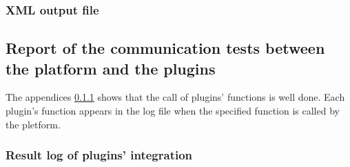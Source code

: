 \subsubsection{XML output file}
\label{xmlsave}


\newpage
\subsection{Report of the communication tests between the platform and the plugins}
The appendices \ref{plugin} shows that the call of plugins' functions is well done. Each plugin's function appears in the log file when
the specified function is called by the pletform.

\subsubsection{Result log of plugins' integration}
\label{plugin}


